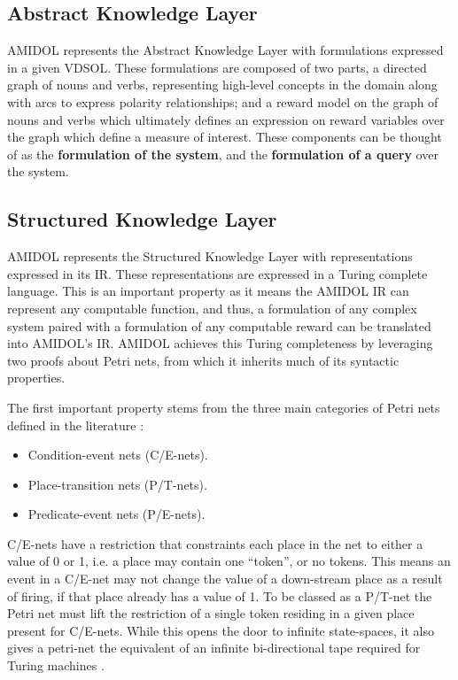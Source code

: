 \documentclass[11pt]{article}
\newcommand{\amidol}{\textsc{AMIDOL}}
\begin{document}
 \subsection{Abstract Knowledge Layer}

 \amidol{} represents the Abstract Knowledge Layer with  formulations
 expressed in a given VDSOL.  These formulations are composed of two
 parts, a directed graph of nouns and verbs, representing high-level
 concepts in the domain along with arcs to express polarity
 relationships; and a reward model on the graph of nouns and verbs
 which ultimately defines an expression on reward variables over the
 graph which define a measure of interest.  These components can be
 thought of as the \textbf{formulation of the system}, and the
 \textbf{formulation of a query} over the system.

 \subsection{Structured Knowledge Layer}

 \amidol{} represents the Structured Knowledge Layer with
 representations expressed in its IR.  These representations are
 expressed in a Turing complete language.  This is an important
 property as it means the \amidol{} IR can represent any computable
 function, and thus, a formulation of any complex system paired with a
 formulation of any computable reward can be translated into
 \amidol{}'s IR.  \amidol{} achieves this Turing completeness by
 leveraging two proofs about Petri nets, from which it inherits much
 of its syntactic properties.

The first important property stems from the three main categories of
Petri nets defined in the literature \cite{reisig2012petri}:
\begin{itemize}
\item Condition-event nets (C/E-nets).
\item Place-transition nets (P/T-nets).
\item Predicate-event nets (P/E-nets).
\end{itemize}

C/E-nets have a restriction that constraints each place in the net to
either a value of 0 or 1, i.e. a place may contain one ``token'', or
no tokens.  This means an event in a C/E-net may not change the value
of a down-stream place as a result of firing, if that place already
has a value of 1.  To be classed as a P/T-net the Petri net must lift
the restriction of a single token residing in a given place present
for C/E-nets.  While this opens the door to infinite state-spaces, it
also gives a petri-net the equivalent of an infinite bi-directional
tape required for Turing machines \cite{reisig2012petri}.
\end{document}

